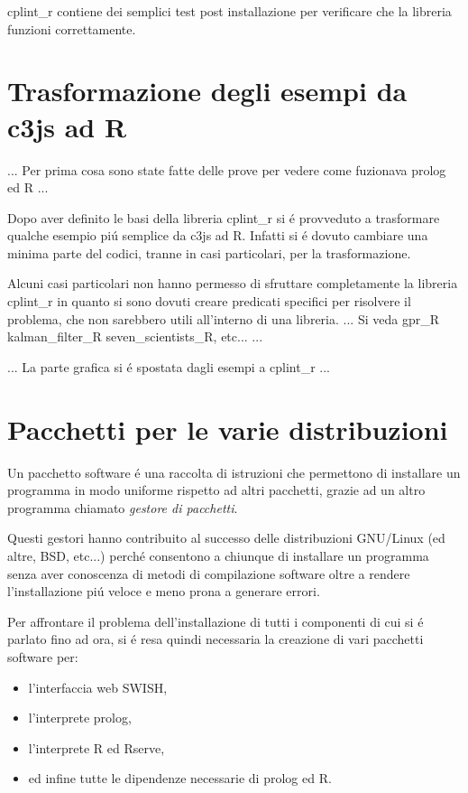 \documentclass[10pt,titlepage,twoside,a4paper]{report}
\begin{document}
cplint\_r contiene dei semplici test post installazione per verificare che la 
libreria funzioni correttamente.




\chapter{Trasformazione degli esempi da c3js ad R} \label{ch:trasformazione-
degli-esempi-da-c3js-ad-r}
... Per prima cosa sono state fatte delle prove per vedere come fuzionava 
prolog ed R ...

Dopo aver definito le basi della libreria cplint\_r si \'e provveduto a 
trasformare qualche esempio pi\'u semplice da c3js ad R. Infatti si \'e 
dovuto cambiare una minima parte del codici, tranne in casi particolari, per la 
trasformazione.

Alcuni casi particolari non hanno permesso di sfruttare completamente la 
libreria cplint\_r in quanto si sono dovuti creare predicati specifici per 
risolvere il problema, che non sarebbero utili all'interno di una libreria. 
... Si veda gpr\_R kalman\_filter\_R seven\_scientists\_R, etc... ...


... La parte grafica si \'e spostata dagli esempi a cplint\_r ...



\chapter{Pacchetti per le varie distribuzioni} 
\label{ch:pacchetti-per-le-varie-distribuzioni}
Un pacchetto software \'e una raccolta di istruzioni che permettono di 
installare un programma in modo uniforme rispetto ad altri pacchetti, grazie ad 
un altro programma chiamato \emph{gestore di pacchetti}.

Questi gestori hanno contribuito al successo delle distribuzioni GNU/Linux (ed 
altre, BSD, etc...) perch\'e consentono a chiunque di installare un programma 
senza aver conoscenza di metodi di compilazione software oltre a rendere 
l'installazione pi\'u veloce e meno prona a generare errori.

Per affrontare il problema dell'installazione di tutti i componenti di cui si 
\'e parlato fino ad ora, si \'e resa quindi necessaria la creazione di vari 
pacchetti software per:
\begin{itemize}
    \item l'interfaccia web SWISH,
    \item l'interprete prolog,
    \item l'interprete R ed Rserve,
    \item ed infine tutte le dipendenze necessarie di prolog ed R.
\end{itemize}
\end{document}
